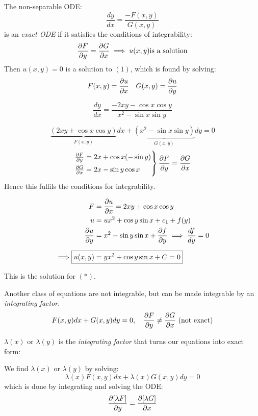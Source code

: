 \documentclass[twoside]{scrartcl}
\begin{document}
\begin{definition}
	 The non-separable ODE: 
\[\frac{dy}{dx} = \frac{-F(x,y)}{G(x,y)}\tag{1}\]
is an \emph{exact ODE} if it satisfies the conditions of integrability: 
\[\dfrac{\partial F}{\partial y} = \dfrac{\partial G}{\partial x} \implies u(x,y)\text {is a solution}\]
Then $u(x,y) = 0$ is a solution to $(1)$, which is found by solving: 
\[F(x,y) = \frac{\partial u}{\partial x}\quad G(x,y) = \frac{\partial u}{\partial y}\]
\end{definition}\vspace*{5pt}


\begin{example}
\[\frac{dy}{dx} = \frac{-2xy-\cos x\cos y}{x^2-\sin x\sin y} \tag{$*$}\]	

\[\underbrace{(2xy + \cos x \cos y)}_{F(x,y)}dx + \underbrace{(x^2-\sin x\sin y)}_{G(x,y)}dy = 0\]
\[
\begin{aligned}
  \begin{rcases*}
  \frac{\del F}{\del y} = 2x + \cos x(-\sin y)\\
  \frac{\del G}{\del x} = 2x - \sin y \cos x	
  \end{rcases*}
  \frac{\del F}{\del y} = \frac{\del G}{\del x}
\end{aligned}
\]
Hence this fulfils the conditions for integrability. 

\[
\begin{aligned}
  F &= \frac{\del u}{\del x} = 2xy + \cos x \cos y\\
  u &= ux^2 + \cos y \sin x + c_1 + f(y)\\
  \frac{\del u}{\del y} &= x^2 - \sin y\sin x + \frac{\del f}{\del y} \implies \frac{df}{dy} = 0\\[0.2cm]
  \implies \Aboxed{u(x,y) &= yx^2 + \cos y\sin x + C = 0}
\end{aligned}
\]

This is the solution for $(*)$. 
\end{example}

Another class of equations are not integrable, but can be made integrable by an \emph{integrating factor}. 
\[F(x,y)dx + G(x,y)dy = 0, \quad  \frac{\partial F}{\partial y} \neq \frac{\partial G}{\partial x} \text{ (not exact)}\]

 \begin{definition}
	$\lambda(x)$ or $\lambda(y)$ is the \emph{integrating factor} that turns our equations into exact form: 
\end{definition}

We find $\lambda(x)$ or $\lambda(y)$ by solving:
\[\lambda(x)F(x,y)dx + \lambda(x)G(x,y)dy = 0\]
which is done by integrating and solving the ODE: 
\[\frac{\partial[\lambda F]}{\partial y} = \frac{\partial[\lambda G]}{\partial x}\]
\end{document}
